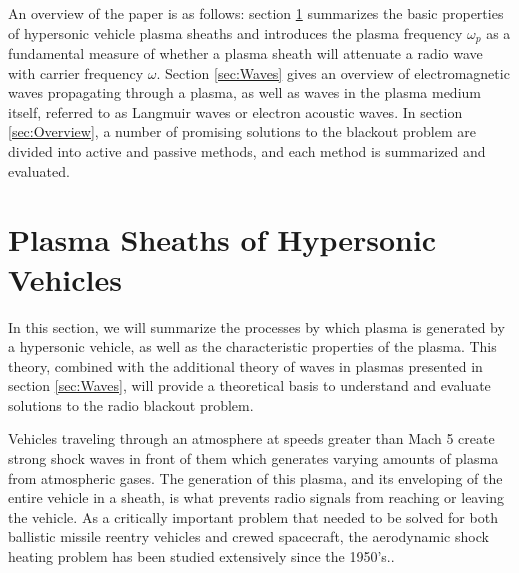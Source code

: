 \documentclass[twocolumn]{article}
\begin{document}
	An overview of the paper is as follows: section \ref{sec:PlasmaSheaths} summarizes the basic properties of hypersonic vehicle plasma sheaths and introduces the plasma frequency $\omega_p$ as a fundamental measure of whether a plasma sheath will attenuate a radio wave with carrier frequency $\omega$.
	Section \ref{sec:Waves} gives an overview of electromagnetic waves propagating through a plasma, as well as waves in the plasma medium itself, referred to as Langmuir waves or electron acoustic waves.
	In section \ref{sec:Overview}, a number of promising solutions to the blackout problem are divided into active and passive methods, and each method is summarized and evaluated.
	
\section{Plasma Sheaths of Hypersonic Vehicles} \label{sec:PlasmaSheaths}
In this section, we will summarize the processes by which plasma is generated by a hypersonic vehicle, as well as the characteristic properties of the plasma.
This theory, combined with the additional theory of waves in plasmas presented in section \ref{sec:Waves}, will provide a theoretical basis to understand and evaluate solutions to the radio blackout problem.

Vehicles traveling through an atmosphere at speeds greater than Mach 5 create strong shock waves in front of them which generates varying amounts of plasma from atmospheric gases.
The generation of this plasma, and its enveloping of the entire vehicle in a sheath, is what prevents radio signals from reaching or leaving the vehicle.
As a critically important problem that needed to be solved for both ballistic missile reentry vehicles and crewed spacecraft, the aerodynamic shock heating problem has been studied extensively since the 1950's.\cite{allen_study_1958}\cite{dunn_theoretical_1973}\cite{allen_aerodynamic_1964}\cite{launius_coming_2012}.
\end{document}
